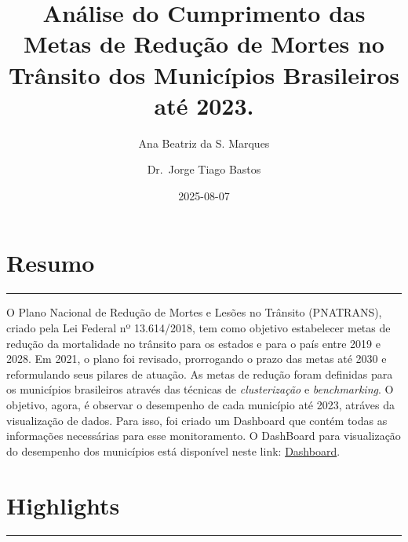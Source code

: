 \documentclass[
  letterpaper,
  DIV=11,
  numbers=noendperiod]{scrreprt}
\title{Análise do Cumprimento das Metas de Redução de Mortes no Trânsito
dos Municípios Brasileiros até 2023.}
\author{Ana Beatriz da S. Marques \and Dr.~Jorge Tiago Bastos}
\date{2025-08-07}
\renewcommand*\contentsname{Table of contents}
\newcommand\contentsname{Table of contents}
\begin{document}
\maketitle

\renewcommand*\contentsname{Table of contents}
{
\hypersetup{linkcolor=}
\setcounter{tocdepth}{2}
\tableofcontents
}


\chapter*{Resumo}\label{resumo}


\begin{center}\rule{0.5\linewidth}{0.5pt}\end{center}

O Plano Nacional de Redução de Mortes e Lesões no Trânsito (PNATRANS),
criado pela Lei Federal nº 13.614/2018, tem como objetivo estabelecer
metas de redução da mortalidade no trânsito para os estados e para o
país entre 2019 e 2028. Em 2021, o plano foi revisado, prorrogando o
prazo das metas até 2030 e reformulando seus pilares de atuação. As
metas de redução foram definidas para os municípios brasileiros através
das técnicas de \emph{clusterização} e \emph{benchmarking}. O objetivo,
agora, é observar o desempenho de cada município até 2023, atráves da
visualização de dados. Para isso, foi criado um Dashboard que contém
todas as informações necessárias para esse monitoramento. O DashBoard
para visualização do desempenho dos municípios está disponível neste
link:
\href{https://beatrizmarques.shinyapps.io/cumprimento_metas/}{Dashboard}.


\chapter*{Highlights}\label{highlights}


\begin{center}\rule{0.5\linewidth}{0.5pt}\end{center}
\end{document}

